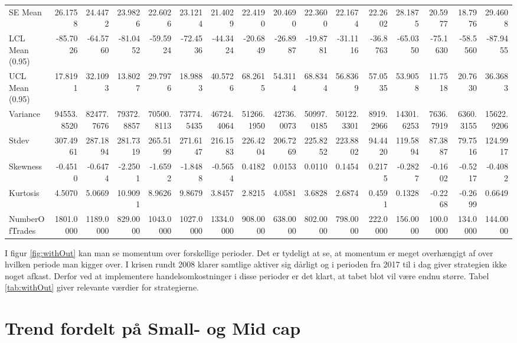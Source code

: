 \documentclass[]{article}
\begin{document}
\begin{table}
{\begin{tabular}[t]{lrrrrrrrrrrrrrrr}
SE Mean & 26.1758 & 24.4472 & 23.9826 & 22.6026 & 23.1214 & 21.4029 & 22.4190 & 20.4690 & 22.3600 & 22.1674 & 22.2602 & 28.1875 & 20.5977 & 18.7976 & 29.4608\\
\addlinespace
LCL Mean (0.95) & -85.7026 & -64.5760 & -81.0452 & -59.5924 & -72.4536 & -44.3424 & -20.6849 & -26.8987 & -19.8781 & -31.1116 & -36.8763 & -65.0350 & -75.1630 & -58.5560 & -87.9455\\
UCL Mean (0.95) & 17.8191 & 32.1093 & 13.8027 & 29.7976 & 18.9883 & 40.5726 & 68.2615 & 54.3114 & 68.8344 & 56.8369 & 57.0535 & 53.9058 & 11.7518 & 20.7630 & 36.3683\\
Variance & 94553.8520 & 82477.7676 & 79372.8857 & 70500.8113 & 73774.5435 & 46724.4064 & 51266.1950 & 42736.0073 & 50997.0185 & 50122.3301 & 8919.2966 & 14301.6253 & 7636.7919 & 6360.3155 & 15622.9206\\
Stdev & 307.4961 & 287.1894 & 281.7319 & 265.5199 & 271.6147 & 216.1583 & 226.4204 & 206.7269 & 225.8252 & 223.8802 & 94.4420 & 119.5894 & 87.3887 & 79.7516 & 124.9917\\
Skewness & -0.4510 & -0.6474 & -2.2501 & -1.6592 & -1.8488 & -0.5654 & 0.4182 & 0.0153 & 0.0110 & 0.1454 & 0.2175 & -0.2827 & -0.1602 & -0.5217 & -0.4082\\
\addlinespace
Kurtosis & 4.5070 & 5.0669 & 10.9091 & 8.9626 & 9.8679 & 3.8457 & 2.8215 & 4.0581 & 3.6828 & 2.6874 & 0.4591 & 0.1328 & -0.2268 & -0.2699 & 0.6649\\
NumberOfTrades & 1801.0000 & 1189.0000 & 829.0000 & 1043.0000 & 1027.0000 & 1334.0000 & 908.0000 & 638.0000 & 802.0000 & 798.0000 & 222.0000 & 156.0000 & 100.0000 & 134.0000 & 144.0000\\
\bottomrule
\end{tabular}}
\end{table}

I figur \ref{fig:withOut} kan man se momentum over forskellige perioder.
Det er tydeligt at se, at momentum er meget overhængigt af over hvilken
periode man kigger over. I krisen rundt 2008 klarer samtlige aktiver sig
dårligt og i perioden fra 2017 til i dag giver strategien ikke noget
afkast. Derfor ved at implementere handelsomkostninger i disse perioder
er det klart, at tabet blot vil være endnu større. Tabel
\ref{tab:withOut} giver relevante værdier for strategierne.

\hypertarget{trend-fordelt-pa-small--og-mid-cap}{%
\section{Trend fordelt på Small- og Mid
cap}\label{trend-fordelt-pa-small--og-mid-cap}}
\end{document}
